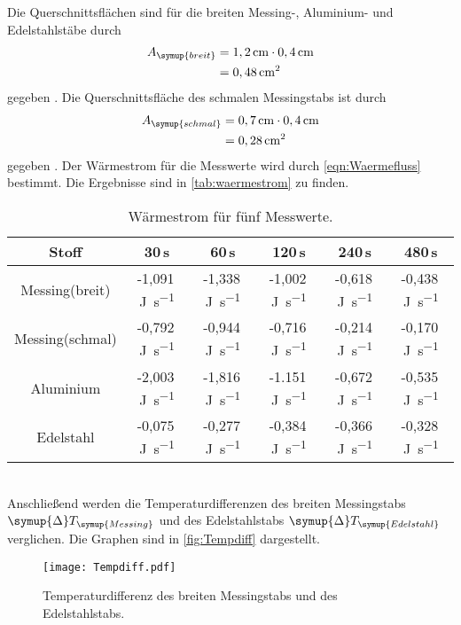 Die Querschnittsflächen sind für die breiten Messing-, Aluminium- und Edelstahlstäbe durch
\begin{align*}
  A_{\symup{breit}} &= 1,2\,\si{\centi\meter}\cdot 0,4\,\si{\centi\meter} \\
                    &= 0,48\,\si{\centi\meter^2}
\end{align*}
gegeben \cite{sample}. Die Querschnittsfläche des schmalen Messingstabs ist durch
\begin{align*}
  A_{\symup{schmal}} &= 0,7\,\si{\centi\meter}\cdot 0,4\,\si{\centi\meter} \\
                     &= 0,28\,\si{\centi\meter^2}
\end{align*}
gegeben \cite{sample}.
Der Wärmestrom für die Messwerte wird durch \autoref{eqn:Waermefluss} bestimmt. Die Ergebnisse sind in \autoref{tab:waermestrom} zu finden.
\begin{table}
  \centering
  \caption{Wärmestrom für fünf Messwerte.}
  \label{tab:waermestrom}
  \begin{tabular}{c | c c c c c}
    \toprule
    Stoff & 30\,\si{\second} & 60\,\si{\second} & 120\,\si{\second} & 240\,\si{\second} & 480\,\si{\second} \\
    \midrule
    Messing(breit)  & -1,091\,\si{\joule\per\second} & -1,338\,\si{\joule\per\second} & -1,002\,\si{\joule\per\second} & -0,618\,\si{\joule\per\second} & -0,438\,\si{\joule\per\second} \\
    Messing(schmal) & -0,792\,\si{\joule\per\second} & -0,944\,\si{\joule\per\second} & -0,716\,\si{\joule\per\second} & -0,214\,\si{\joule\per\second} & -0,170\,\si{\joule\per\second} \\
    Aluminium       & -2,003\,\si{\joule\per\second} & -1,816\,\si{\joule\per\second} & -1.151\,\si{\joule\per\second} & -0,672\,\si{\joule\per\second} & -0,535\,\si{\joule\per\second} \\
    Edelstahl       & -0,075\,\si{\joule\per\second} & -0,277\,\si{\joule\per\second} & -0,384\,\si{\joule\per\second} & -0,366\,\si{\joule\per\second} & -0,328\,\si{\joule\per\second} \\
    \bottomrule
  \end{tabular}
\end{table}
\\
Anschließend werden die Temperaturdifferenzen des breiten Messingstabs $\symup{\Delta}T_{\symup{Messing}}$ und des Edelstahlstabs $\symup{\Delta}T_{\symup{Edelstahl}}$
verglichen. Die Graphen sind in \autoref{fig:Tempdiff} dargestellt.
\begin{figure}[h]
  \centering
  \texttt{[image: Tempdiff.pdf]}
  \caption{Temperaturdifferenz des breiten Messingstabs und des Edelstahlstabs.}
  \label{fig:Tempdiff}
\end{figure}
